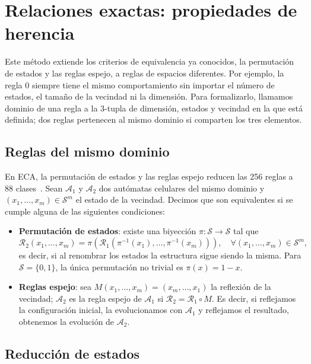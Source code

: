 \section{Relaciones exactas: propiedades de herencia}
\label{sec:inheritance}

Este método extiende los criterios de equivalencia ya conocidos, la permutación de estados y las reglas espejo, a reglas de espacios diferentes. Por ejemplo, la regla 0 siempre tiene el mismo comportamiento sin importar el número de estados, el tamaño de la vecindad ni la dimensión. Para formalizarlo, llamamos dominio de una regla a la 3-tupla de dimensión, estados y vecindad en la que está definida; dos reglas pertenecen al mismo dominio si comparten los tres elementos.

\subsection{Reglas del mismo dominio}
\label{subsection:rules_same_domain}

En ECA, la permutación de estados y las reglas espejo reducen las 256 reglas a 88 clases~\cite{genaro2013_class}. Sean $\mathcal{A}_1$ y $\mathcal{A}_2$ dos autómatas celulares del mismo dominio y $(x_1, \dots, x_m) \in \mathcal{S}^m$ el estado de la vecindad. Decimos que son equivalentes si se cumple alguna de las siguientes condiciones:
\begin{itemize}
    \item \textbf{Permutación de estados}: existe una biyección $\pi : \mathcal{S} \to \mathcal{S}$ tal que
    \[
    \mathcal{R}_2(x_1, \dots, x_m) = \pi\left( \mathcal{R}_1\left( \pi^{-1}(x_1), \dots, \pi^{-1}(x_m) \right) \right), \quad \forall (x_1, \dots, x_m) \in \mathcal{S}^m,
    \]
    es decir, si al renombrar los estados la estructura sigue siendo la misma. Para $\mathcal{S} = \{0, 1\}$, la única permutación no trivial es $\pi(x) = 1 - x$.

    \item \textbf{Reglas espejo}: sea $M(x_1, \dots, x_m) = (x_m, \dots, x_1)$ la reflexión de la vecindad; $\mathcal{A}_2$ es la regla espejo de $\mathcal{A}_1$ si $\mathcal{R}_2 = \mathcal{R}_1 \circ M$. Es decir, si reflejamos la configuración inicial, la evolucionamos con $\mathcal{A}_1$ y reflejamos el resultado, obtenemos la evolución de $\mathcal{A}_2$.
\end{itemize}

\subsection{Reducción de estados}

